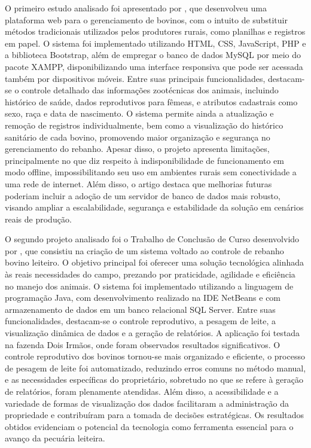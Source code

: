 \documentclass[11pt,a4paper]{article}
\begin{document}
O primeiro estudo analisado foi apresentado por \cite{SCHAFFER2021}, que desenvolveu uma plataforma web para o gerenciamento de bovinos, com o intuito de substituir métodos tradicionais utilizados pelos produtores rurais, como planilhas e registros em papel. O sistema foi implementado utilizando HTML, CSS, JavaScript, PHP e a biblioteca Bootstrap, além de empregar o banco de dados MySQL por meio do pacote XAMPP, disponibilizando uma interface responsiva que pode ser acessada também por dispositivos móveis. Entre suas principais funcionalidades, destacam-se o controle detalhado das informações zootécnicas dos animais, incluindo histórico de saúde, dados reprodutivos para fêmeas, e atributos cadastrais como sexo, raça e data de nascimento. O sistema permite ainda a atualização e remoção de registros individualmente, bem como a visualização do histórico sanitário de cada bovino, promovendo maior organização e segurança no gerenciamento do rebanho. Apesar disso, o projeto apresenta limitações, principalmente no que diz respeito à indisponibilidade de funcionamento em modo offline, impossibilitando seu uso em ambientes rurais sem conectividade a uma rede de internet. Além disso, o artigo destaca que melhorias futuras poderiam incluir a adoção de um servidor de banco de dados mais robusto, visando ampliar a escalabilidade, segurança e estabilidade da solução em cenários reais de produção.

O segundo projeto analisado foi o Trabalho de Conclusão de Curso desenvolvido por \cite{Pamella2017}, que consistiu na criação de um sistema voltado ao controle de rebanho bovino leiteiro. O objetivo principal foi oferecer uma solução tecnológica alinhada às reais necessidades do campo, prezando por praticidade, agilidade e eficiência no manejo dos animais. O sistema foi implementado utilizando a linguagem de programação Java, com desenvolvimento realizado na IDE NetBeans e com armazenamento de dados em um banco relacional SQL Server. Entre suas funcionalidades, destacam-se o controle reprodutivo, a pesagem de leite, a visualização dinâmica de dados e a geração de relatórios. A aplicação foi testada na fazenda Dois Irmãos, onde foram observados resultados significativos. O controle reprodutivo dos bovinos tornou-se mais organizado e eficiente, o processo de pesagem de leite foi automatizado, reduzindo erros comuns no método manual, e as necessidades específicas do proprietário, sobretudo no que se refere à geração de relatórios, foram plenamente atendidas. Além disso, a acessibilidade e a variedade de formas de visualização dos dados facilitaram a administração da propriedade e contribuíram para a tomada de decisões estratégicas. Os resultados obtidos evidenciam o potencial da tecnologia como ferramenta essencial para o avanço da pecuária leiteira.
\end{document}
